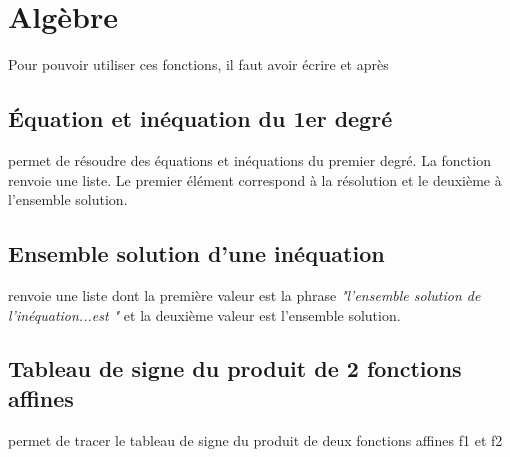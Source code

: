 




\maketitle
\enableopenany
\tableofcontents


\chapter{Algèbre}
Pour pouvoir utiliser ces fonctions, il faut avoir écrire \pyv{} et \pyv{} après \pyv{}
\section{Équation et inéquation du 1er degré}
 permet de résoudre des équations et inéquations du premier degré. La fonction renvoie une liste. Le premier élément correspond à la résolution et le deuxième à l'ensemble solution.
\section{Ensemble solution d'une inéquation}
 renvoie une liste dont la première valeur est la phrase \textit{"l'ensemble solution de l'inéquation...est "} et la deuxième valeur est l'ensemble solution.
 
\section{Tableau de signe du produit de 2 fonctions affines}
 permet de tracer le tableau de signe du produit de deux fonctions affines f1 et f2
